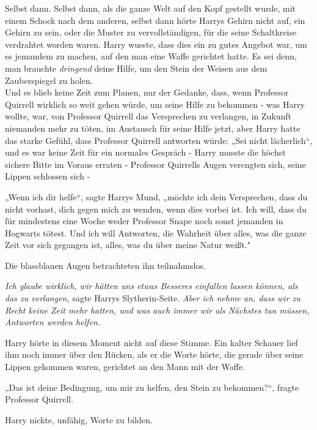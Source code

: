 {Selbst dann. Selbst dann, als die ganze Welt auf den Kopf gestellt wurde, mit einem Schock nach dem anderen, selbst dann hörte Harrys Gehirn nicht auf, ein Gehirn zu sein, oder die Muster zu vervollständigen, für die seine Schaltkreise verdrahtet worden waren. Harry wusste, dass dies ein zu gutes Angebot war, um es jemandem zu machen, auf den man eine Waffe gerichtet hatte. Es sei denn, man brauchte \emph{dringend} deine Hilfe, um den Stein der Weisen aus dem Zauberspiegel zu holen.\\ Und es blieb keine Zeit zum Planen, nur der Gedanke, dass, wenn Professor Quirrell wirklich so weit gehen würde, um seine Hilfe zu bekommen - was Harry wollte, war, von Professor Quirrell das Versprechen zu verlangen, in Zukunft niemanden mehr zu töten, im Austausch für seine Hilfe jetzt, aber Harry hatte das starke Gefühl, dass Professor Quirrell antworten würde: „Sei nicht lächerlich“, und es war keine Zeit für ein normales Gespräch - Harry musste die höchst sichere Bitte im Voraus erraten - Professor Quirrells Augen verengten sich, seine Lippen schlossen sich -

„Wenn ich dir helfe“, sagte Harrys Mund, „möchte ich dein Versprechen, dass du nicht vorhast, dich gegen mich zu wenden, wenn dies vorbei ist. Ich will, dass du für mindestens eine Woche weder Professor Snape noch sonst jemanden in Hogwarts tötest. Und ich will Antworten, die Wahrheit über alles, was die ganze Zeit vor sich gegangen ist, alles, was du über meine Natur weißt."

Die blassblauen Augen betrachteten ihn teilnahmslos.

\emph{Ich glaube wirklich, wir hätten uns etwas Besseres einfallen lassen können, als das zu verlangen,} sagte Harrys Slytherin-Seite. \emph{Aber ich nehme an, dass wir zu Recht keine Zeit mehr hatten, und was auch immer wir als Nächstes tun müssen, Antworten werden helfen.}

Harry hörte in diesem Moment nicht auf diese Stimme. Ein kalter Schauer lief ihm noch immer über den Rücken, als er die Worte hörte, die gerade über seine Lippen gekommen waren, gerichtet an den Mann mit der Waffe.

„Das ist deine Bedingung, um mir zu helfen, den Stein zu bekommen?“, fragte Professor Quirrell.

Harry nickte, unfähig, Worte zu bilden.

}
